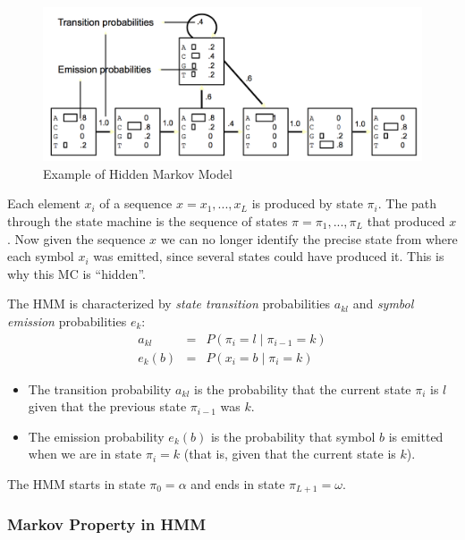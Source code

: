 \begin{figure}[!htb]
\centerline{\includegraphics[width=.8\linewidth]{figs/HMM-example.png}}
\caption{Example of Hidden Markov Model}\label{fig:hmm}
\end{figure}

Each element $x_i$ of a sequence $x = x_1, ..., x_L$ is produced by state $\pi_i$. The path through the state machine is the sequence of states $\pi = \pi_1, ..., \pi_L$ that produced $x$.
Now given the sequence $x$ we can no longer identify the precise state from where each symbol $x_i$ was emitted, since several states could have produced it. This is why this MC is ``hidden''.

The HMM is characterized by {\em state transition} probabilities $a_{kl}$ and {\em symbol emission} probabilities $e_k$:
\begin{eqnarray}
a_{kl} & = & P(\pi_i=l \; | \; \pi_{i-1}=k) \label{eq:hmm:transition} \\
e_{k}(b) & = & P(x_i=b \; | \; \pi_i=k) \label{eq:hmm:emission}
\end{eqnarray}
\begin{itemize}
\item The transition probability $a_{kl}$ is the probability that the current state $\pi_i$ is $l$ given that the previous state $\pi_{i-1}$ was $k$.
\item The emission probability $e_{k}(b)$ is the probability that symbol $b$ is emitted when we are in state $\pi_i=k$ (that is, given that the current state is $k$).
\end{itemize}

The HMM starts in state $\pi_0 = \alpha$ and ends in state $\pi_{L+1}=\omega$.

\subsubsection{Markov Property in HMM}

